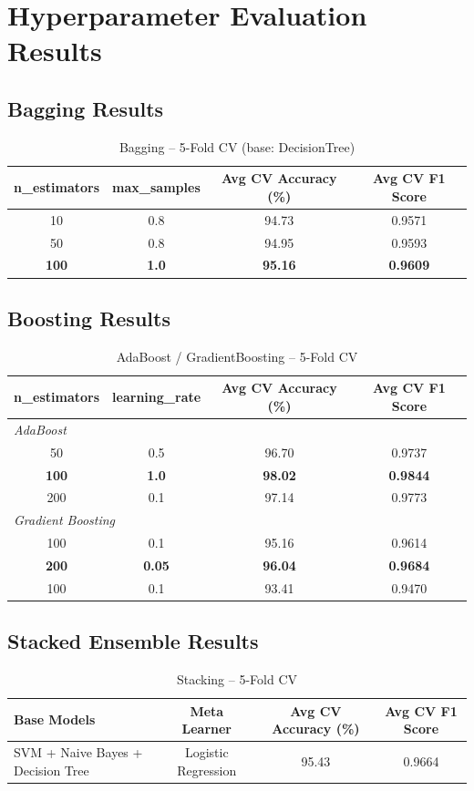 \documentclass[11pt]{article}
\begin{document}
\section*{Hyperparameter Evaluation Results}

\subsection*{Bagging Results}
\begin{table}[H]
\centering
\caption{Bagging -- 5-Fold CV (base: DecisionTree)}
\begin{tabular}{cccc}
\toprule
n\_estimators & max\_samples & Avg CV Accuracy (\%) & Avg CV F1 Score \\
\midrule
10  & 0.8 & 94.73 & 0.9571 \\
50  & 0.8 & 94.95 & 0.9593 \\
\textbf{100} & \textbf{1.0} & \textbf{95.16} & \textbf{0.9609} \\
\bottomrule
\end{tabular}
\end{table}

\subsection*{Boosting Results}
\begin{table}[H]
\centering
\caption{AdaBoost / GradientBoosting -- 5-Fold CV}
\begin{tabular}{cccc}
\toprule
n\_estimators & learning\_rate & Avg CV Accuracy (\%) & Avg CV F1 Score \\
\midrule
\multicolumn{4}{l}{\textit{AdaBoost}} \\
50  & 0.5 & 96.70 & 0.9737 \\
\textbf{100} & \textbf{1.0} & \textbf{98.02} & \textbf{0.9844} \\
200 & 0.1 & 97.14 & 0.9773 \\
\midrule
\multicolumn{4}{l}{\textit{Gradient Boosting}} \\
100 & 0.1  & 95.16 & 0.9614 \\
\textbf{200} & \textbf{0.05} & \textbf{96.04} & \textbf{0.9684} \\
100 & 0.1  & 93.41 & 0.9470 \\
\bottomrule
\end{tabular}
\end{table}

\subsection*{Stacked Ensemble Results}
\begin{table}[H]
\centering
\caption{Stacking -- 5-Fold CV}
\begin{tabular}{lccc}
\toprule
Base Models & Meta Learner & Avg CV Accuracy (\%) & Avg CV F1 Score \\
\midrule
SVM + Naive Bayes + Decision Tree & Logistic Regression & 95.43 & 0.9664 \\
\bottomrule
\end{tabular}
\end{table}
\end{document}
